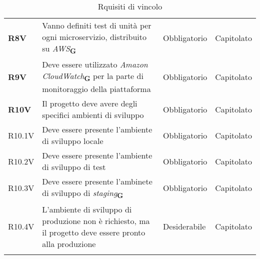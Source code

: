 \begin{center}
\begin{longtable}[!h]{p{50px} p{200px} p{100px} p{50px}}
        \textbf{R8V}                          & Vanno definiti test di unità per ogni microservizio, distribuito su \textit{AWS}\textsubscript{\textbf{G}}                                                                                    & Obbligatorio             & Capitolato     \\
        \textbf{R9V} & Deve essere utilizzato \textit{Amazon CloudWatch}\textsubscript{\textbf{G}} per la parte di monitoraggio della piattaforma & Obbligatorio & Capitolato\\ 
        \textbf{R10V} & Il progetto deve avere degli specifici ambienti di sviluppo & Obbligatorio & Capitolato \\
        R10.1V& Deve essere presente l'ambiente di sviluppo locale&Obbligatorio&Capitolato\\
        R10.2V& Deve essere presente l'ambiente di sviluppo di test&Obbligatorio&Capitolato\\
        R10.3V& Deve essere presente l'ambinete di sviluppo di \textit{staging}\textsubscript{\textbf{G}}&Obbligatorio&Capitolato\\
        R10.4V& L'ambiente di sviluppo di produzione non è richiesto, ma il progetto deve essere pronto alla produzione & Desiderabile & Capitolato\\
        \rowcolor{white}\caption{Rquisiti di vincolo}
    \end{longtable}
\end{center}

\newpage
